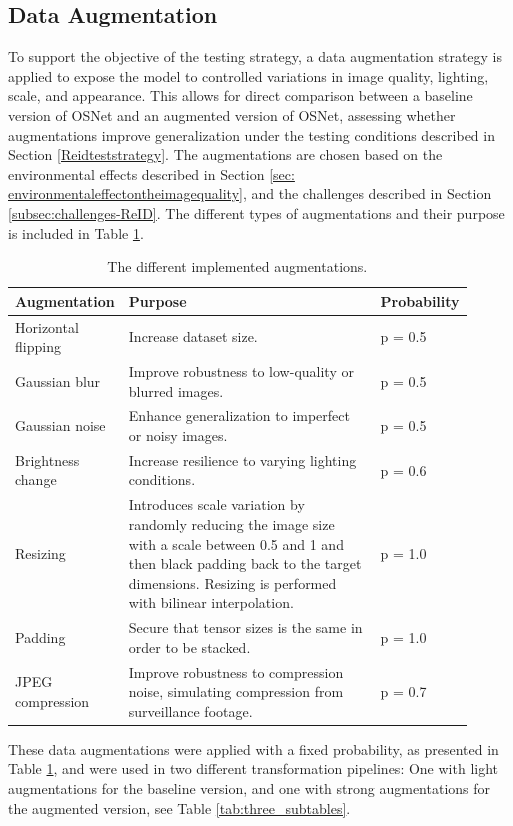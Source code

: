 \subsection{Data Augmentation} \label{sec: dataaugmentation}
To support the objective of the testing strategy, a data augmentation strategy is applied to expose the model to controlled variations in image quality, lighting, scale, and appearance. This allows for direct comparison between a baseline version of \acs{OSNet} and an augmented version of \acs{OSNet}, assessing whether augmentations improve generalization under the testing conditions described in Section \ref{Reidteststrategy}. The augmentations are chosen based on the environmental effects described in Section \ref{sec: environmentaleffectontheimagequality}, and the challenges described in Section \ref{subsec:challenges-ReID}. The different types of augmentations and their purpose is included in Table \ref{tab:augmentationtypes}. 

\begin{table}[H]
    \centering
    \begin{tabular}{|>{\centering\arraybackslash}p{0.18\linewidth}|>{\centering\arraybackslash}p{0.6\linewidth}|>{\raggedright\arraybackslash}p{0.13\linewidth}|}\hline
         \cellcolor[HTML]{D8E9F7} \textbf{Augmentation}&  \cellcolor[HTML]{D8E9F7} \textbf{Purpose} &\cellcolor[HTML]{D8E9F7} \textbf{Probability}\\\hline
         Horizontal flipping&  Increase dataset size. &p = 0.5\\\hline
 Gaussian blur&Improve robustness to low-quality or blurred images. &p = 0.5\\\hline
 Gaussian noise&Enhance generalization to imperfect or noisy images. &p = 0.5\\\hline
 Brightness change&Increase resilience to varying lighting conditions. &p = 0.6\\\hline
 Resizing&Introduces scale variation by randomly reducing the image size with a scale between 0.5 and 1 and then black padding back to the target dimensions. Resizing is performed with bilinear interpolation. &p = 1.0\\\hline
 Padding& Secure that tensor sizes is the same in order to be stacked. &p = 1.0\\\hline
 JPEG compression& Improve robustness to compression noise, simulating compression from surveillance footage. &p = 0.7\\ \hline
    \end{tabular}
    \caption{The different implemented augmentations.}
    \label{tab:augmentationtypes}
\end{table}
\noindent These data augmentations were applied with a fixed probability, as presented in Table \ref{tab:augmentationtypes}, and were used in two different transformation pipelines: One with light augmentations for the baseline version, and one with strong augmentations for the augmented version, see Table \ref{tab:three_subtables}.

